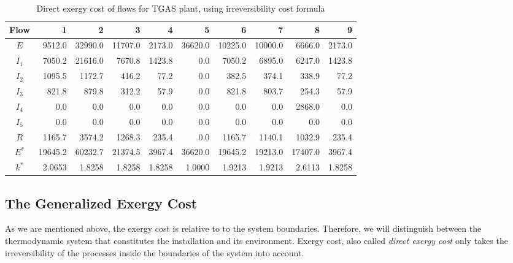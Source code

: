 \documentclass{ecos}
\begin{document}
\begin{table}[H]
	\small
	\caption{Direct exergy cost of flows for TGAS plant, using irreversibility cost formula}
	\begin{tabular}{crrrrrrrrr}
		\toprule
		Flow & 1 & 2 & 3 & 4 & 5 & 6 & 7 & 8 & 9 \\
		\midrule
		$E$     & 9512.0 & 32990.0 & 11707.0 & 2173.0 & 36620.0 & 10225.0 & 10000.0 & 6666.0 & 2173.0 \\
		\midrule
		$I_1$    & 7050.2 & 21616.0 & 7670.8 & 1423.8 & 0.0   & 7050.2 & 6895.0 & 6247.0 & 1423.8 \\
		$I_2$    & 1095.5 & 1172.7 & 416.2 & 77.2  & 0.0   & 382.5 & 374.1 & 338.9 & 77.2 \\
		$I_3$    & 821.8 & 879.8 & 312.2 & 57.9  & 0.0   & 821.8 & 803.7 & 254.3 & 57.9 \\
		$I_4$    & 0.0   & 0.0   & 0.0   & 0.0   & 0.0   & 0.0   & 0.0   & 2868.0 & 0.0 \\
		$I_5$    & 0.0   & 0.0   & 0.0   & 0.0   & 0.0   & 0.0   & 0.0   & 0.0   & 0.0 \\
		$R$     & 1165.7 & 3574.2 & 1268.3 & 235.4 & 0.0   & 1165.7 & 1140.1 & 1032.9 & 235.4 \\
		\midrule
		$E^*$ & 19645.2 & 60232.7 & 21374.5 & 3967.4 & 36620.0 & 19645.2 & 19213.0 & 17407.0 & 3967.4 \\
		\midrule
		$k^*$ & 2.0653  & 1.8258	& 1.8258  &	1.8258 & 1.0000	& 1.9213 & 1.9213 & 2.6113 & 1.8258 \\
		\bottomrule
	\end{tabular}%
	\label{tab4}%
\end{table}%

\subsection{The Generalized Exergy Cost}
As we are mentioned above, the exergy cost is relative to  to the system boundaries.
Therefore, we will distinguish between the thermodynamic system that constitutes the installation and its environment. Exergy cost, also called \emph{direct exergy cost} only takes the irreversibility of the processes inside the boundaries of the system into account. 
\end{document}
